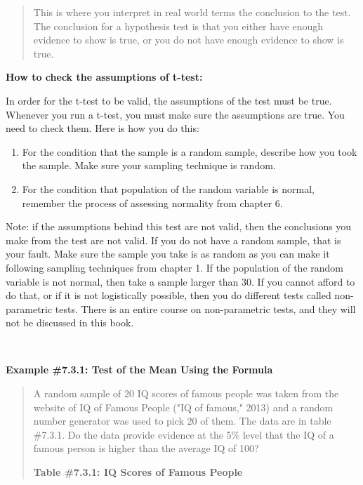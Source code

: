 \documentclass[]{book}
\begin{document}
\begin{quote}
This is where you interpret in real world terms the conclusion to the
test. The conclusion for a hypothesis test is that you either have
enough evidence to show is true, or you do not have enough evidence to
show is true.
\end{quote}

\textbf{How to check the assumptions of t-test:}

In order for the t-test to be valid, the assumptions of the test must be
true. Whenever you run a t-test, you must make sure the assumptions are
true. You need to check them. Here is how you do this:

\begin{enumerate}
\def\labelenumi{\arabic{enumi}.}
\item
  For the condition that the sample is a random sample, describe how
  you took the sample. Make sure your sampling technique is random.
\item
  For the condition that population of the random variable is normal,
  remember the process of assessing normality from chapter 6.
\end{enumerate}

Note: if the assumptions behind this test are not valid, then the
conclusions you make from the test are not valid. If you do not have a
random sample, that is your fault. Make sure the sample you take is as
random as you can make it following sampling techniques from chapter 1.
If the population of the random variable is not normal, then take a
sample larger than 30. If you cannot afford to do that, or if it is not
logistically possible, then you do different tests called non-parametric
tests. There is an entire course on non-parametric tests, and they will
not be discussed in this book.

\textbf{\\
}

\textbf{Example \#7.3.1: Test of the Mean Using the Formula}

\begin{quote}
A random sample of 20 IQ scores of famous people was taken from the
website of IQ of Famous People ("IQ of famous," 2013) and a random
number generator was used to pick 20 of them. The data are in table
\#7.3.1. Do the data provide evidence at the 5\% level that the IQ of a
famous person is higher than the average IQ of 100?

\textbf{Table \#7.3.1: IQ Scores of Famous People}
\end{quote}
\end{document}

